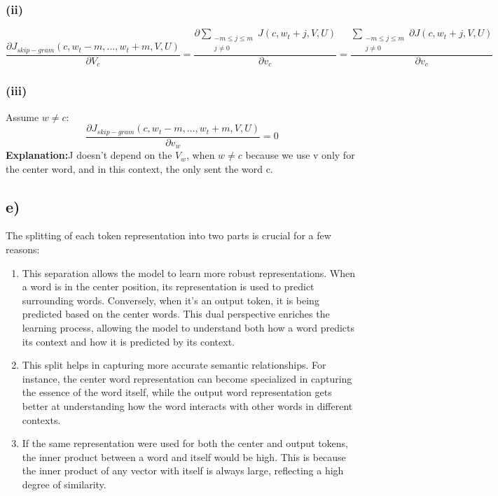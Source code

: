 \documentclass{article}
\begin{document}
\subsubsection*{(ii)}
\[
\frac{\partial J_{skip-gram}(c, w_t-m,...,w_t+m, V, U)}{\partial V_c} = 
\frac{\partial\sum_{\substack{-m \leq j \leq m \\ j \neq 0}} J(c, w_t+j, V, U)}{\partial v_c} = \frac{\sum_{\substack{-m \leq j \leq m \\ j \neq 0}}\partial J(c, w_t+j, V, U)}{\partial v_c}
\]

\subsubsection*{(iii)}
Assume $w \neq c$:
\[
\frac{\partial J_{skip-gram}(c, w_t-m,...,w_t+m, V, U)}{\partial v_w} = 0
\]
\textbf{Explanation:}J doesn't depend on the $V_w$, when $w \neq c$ because we use v only for the center word, and in this context, the only sent the word c.

\subsection*{e)}
The splitting of each token representation into two parts is crucial for a few reasons:
\begin{enumerate}
    \item This separation allows the model to learn more robust representations. When a word is in the center position, its representation is used to predict surrounding words. Conversely, when it's an output token, it is being predicted based on the center words. This dual perspective enriches the learning process, allowing the model to understand both how a word predicts its context and how it is predicted by its context.
    \item This split helps in capturing more accurate semantic relationships. For instance, the center word representation can become specialized in capturing the essence of the word itself, while the output word representation gets better at understanding how the word interacts with other words in different contexts.
    \item If the same representation were used for both the center and output tokens, the inner product between a word and itself would be high. This is because the inner product of any vector with itself is always large, reflecting a high degree of similarity.

\end{enumerate}
\end{document}
